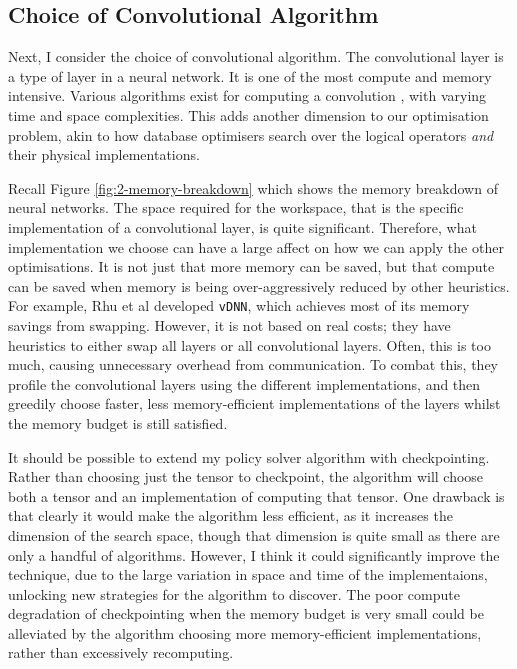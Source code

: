 \subsection{Choice of Convolutional Algorithm}
Next, I consider the choice of convolutional algorithm.
The convolutional layer is a type of layer in a neural network.
It is one of the most compute and memory intensive.
Various algorithms exist for computing a convolution \cite{Xu2018-convs, Li2016-convs}, with varying time and space complexities.
This adds another dimension to our optimisation problem, akin to how database optimisers search over the logical operators \textit{and} their physical implementations.

Recall Figure \ref{fig:2-memory-breakdown} which shows the memory breakdown of neural networks.
The space required for the workspace, that is the specific implementation of a convolutional layer, is quite significant.
Therefore, what implementation we choose can have a large affect on how we can apply the other optimisations.
It is not just that more memory can be saved, but that compute can be saved when memory is being over-aggressively reduced by other heuristics.
For example, Rhu et al \cite{Rhu2016} developed \texttt{vDNN}, which achieves most of its memory savings from swapping.
However, it is not based on real costs; they have heuristics to either swap all layers or all convolutional layers.
Often, this is too much, causing unnecessary overhead from communication.
To combat this, they profile the convolutional layers using the different implementations, and then greedily choose faster, less memory-efficient implementations of the layers whilst the memory budget is still satisfied.

It should be possible to extend my policy solver algorithm with checkpointing.
Rather than choosing just the tensor to checkpoint, the algorithm will choose both a tensor and an implementation of computing that tensor.
One drawback is that clearly it would make the algorithm less efficient, as it increases the dimension of the search space, though that dimension is quite small as there are only a handful of algorithms.
However, I think it could significantly improve the technique, due to the large variation in space and time of the implementaions, unlocking new strategies for the algorithm to discover.
The poor compute degradation of checkpointing when the memory budget is very small could be alleviated by the algorithm choosing more memory-efficient implementations, rather than excessively recomputing.
